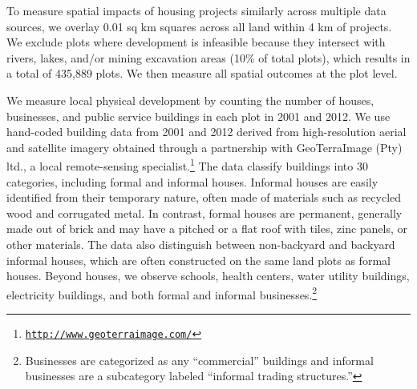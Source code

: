 \documentclass[12pt]{article}
\begin{document}


To measure spatial impacts of housing projects similarly across multiple data sources, we overlay 0.01 sq km squares across all land within 4 km of projects.  We exclude plots where development is infeasible because they intersect with rivers, lakes, and/or mining excavation areas (10\% of total plots), which results in a total of 435,889 plots.  We then measure all spatial outcomes at the plot level. 

We measure local physical development by counting the number of houses, businesses, and public service buildings in each plot in 2001 and 2012.  We use hand-coded building data from 2001 and 2012 derived from high-resolution aerial and satellite imagery obtained through a partnership with GeoTerraImage (Pty) ltd., a local remote-sensing specialist.\footnote{\href{http://www.geoterraimage.com/}{\tt http://www.geoterraimage.com/}} The data classify buildings into 30 categories, including formal and informal houses. Informal houses are easily identified from their temporary nature, often made of materials such as recycled wood and corrugated metal. In contrast, formal houses are permanent, generally made out of brick and may have a pitched or a flat roof with tiles, zinc panels, or other materials.  The data also distinguish between non-backyard and backyard informal houses, which are often constructed on the same land plots as formal houses.  Beyond houses, we observe schools, health centers, water utility buildings, electricity buildings, and both formal and informal businesses.\footnote{Businesses are categorized as any ``commercial'' buildings and informal businesses are a subcategory labeled ``informal trading structures.''}  



\end{document}
